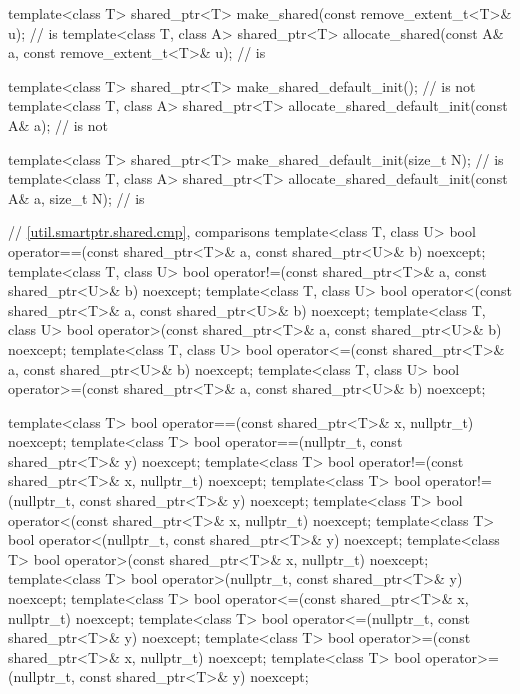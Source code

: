 \begin{codeblock}
{  template<class T>
    shared_ptr<T> make_shared(const remove_extent_t<T>& u);                     //  is 
  template<class T, class A>
    shared_ptr<T> allocate_shared(const A& a, const remove_extent_t<T>& u);     //  is 

  template<class T>
    shared_ptr<T> make_shared_default_init();                                   //  is not 
  template<class T, class A>
    shared_ptr<T> allocate_shared_default_init(const A& a);                     //  is not 

  template<class T>
    shared_ptr<T> make_shared_default_init(size_t N);                           //  is 
  template<class T, class A>
    shared_ptr<T> allocate_shared_default_init(const A& a, size_t N);           //  is 

  // \ref{util.smartptr.shared.cmp},  comparisons
  template<class T, class U>
    bool operator==(const shared_ptr<T>& a, const shared_ptr<U>& b) noexcept;
  template<class T, class U>
    bool operator!=(const shared_ptr<T>& a, const shared_ptr<U>& b) noexcept;
  template<class T, class U>
    bool operator<(const shared_ptr<T>& a, const shared_ptr<U>& b) noexcept;
  template<class T, class U>
    bool operator>(const shared_ptr<T>& a, const shared_ptr<U>& b) noexcept;
  template<class T, class U>
    bool operator<=(const shared_ptr<T>& a, const shared_ptr<U>& b) noexcept;
  template<class T, class U>
    bool operator>=(const shared_ptr<T>& a, const shared_ptr<U>& b) noexcept;

  template<class T>
    bool operator==(const shared_ptr<T>& x, nullptr_t) noexcept;
  template<class T>
    bool operator==(nullptr_t, const shared_ptr<T>& y) noexcept;
  template<class T>
    bool operator!=(const shared_ptr<T>& x, nullptr_t) noexcept;
  template<class T>
    bool operator!=(nullptr_t, const shared_ptr<T>& y) noexcept;
  template<class T>
    bool operator<(const shared_ptr<T>& x, nullptr_t) noexcept;
  template<class T>
    bool operator<(nullptr_t, const shared_ptr<T>& y) noexcept;
  template<class T>
    bool operator>(const shared_ptr<T>& x, nullptr_t) noexcept;
  template<class T>
    bool operator>(nullptr_t, const shared_ptr<T>& y) noexcept;
  template<class T>
    bool operator<=(const shared_ptr<T>& x, nullptr_t) noexcept;
  template<class T>
    bool operator<=(nullptr_t, const shared_ptr<T>& y) noexcept;
  template<class T>
    bool operator>=(const shared_ptr<T>& x, nullptr_t) noexcept;
  template<class T>
    bool operator>=(nullptr_t, const shared_ptr<T>& y) noexcept;

}
\end{codeblock}

